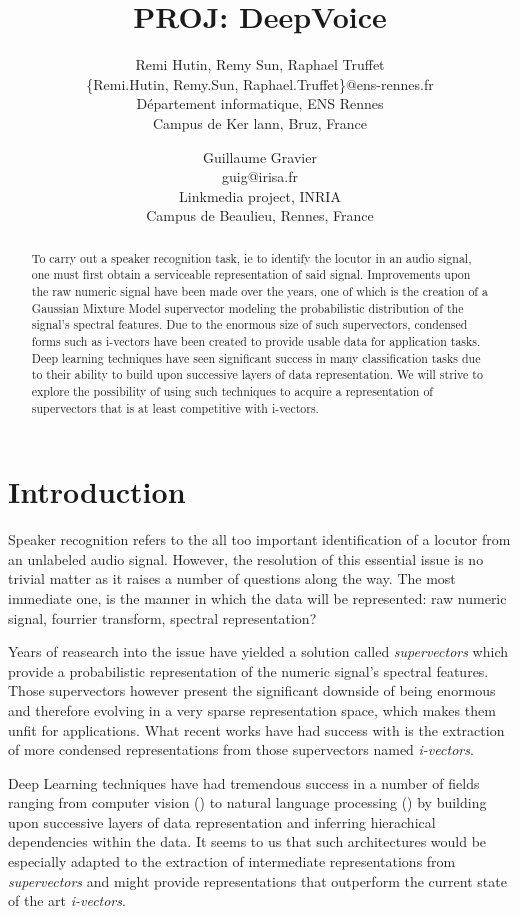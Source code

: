 \documentclass[conference]{IEEEtran}
\title{PROJ: DeepVoice}
\author{Remi Hutin, Remy Sun, Raphael Truffet \\
  \{Remi.Hutin, Remy.Sun, Raphael.Truffet\}@ens-rennes.fr \\
  Département informatique, ENS Rennes \\
  Campus de Ker lann, Bruz, France
\and
  Guillaume Gravier \\
  guig@irisa.fr\\
  Linkmedia project, INRIA \\
  Campus de Beaulieu, Rennes, France
 }
\begin{document}
\maketitle

\begin{abstract}
  To carry out a speaker recognition task, ie to identify the locutor in an
audio signal, one must first obtain a serviceable representation
of said signal. Improvements upon the raw numeric signal have been made over the years, one
of which is the creation of a Gaussian Mixture Model supervector modeling the
probabilistic distribution of the signal's
spectral features. Due to the enormous size of such supervectors, condensed
forms such as i-vectors have been created to provide usable data for application
tasks. Deep learning techniques have seen significant success in many
classification tasks due to their ability to
build upon successive layers of data representation. We will
strive to explore the possibility of using such techniques to acquire a
representation of supervectors that is at least competitive with i-vectors.
\end{abstract}

\section{Introduction}

Speaker recognition refers to the all too important identification of a locutor
from an unlabeled audio signal. However, the resolution of this essential issue
is no trivial matter as it raises a number of questions along the way. The most
immediate one, is the manner in which the data will be represented: raw numeric
signal, fourrier transform, spectral representation? 

Years of reasearch into the issue have yielded a solution called
\emph{supervectors} which provide a probabilistic representation of the
numeric signal's spectral features. Those supervectors however present the
significant downside of being enormous and therefore evolving in a very sparse
representation space, which makes them unfit for applications. What recent works
have had success with is the extraction of more condensed representations from
those supervectors named \emph{i-vectors}.

Deep Learning techniques have had tremendous success in a number of fields
ranging from computer vision (\cite{lecun1998gradient}) to natural language
processing (\cite{bordes2012joint}) by building upon successive layers of data
representation and inferring hierachical dependencies within the data. It seems
to us that such architectures would be especially adapted to the extraction of
intermediate representations from \emph{supervectors} and might provide
representations that outperform the current state of the art \emph{i-vectors}.
\end{document}
